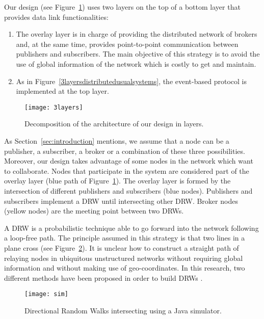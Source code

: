 \documentclass[conference]{IEEEtran}
\begin{document}
Our design (see Figure~\ref{3layers}) uses two layers on the top of a bottom layer that provides data link functionalities:

\begin{enumerate}
\item The overlay layer is in charge of providing the distributed network of brokers and, at the same time, provides point-to-point communication between publishers and subscribers. The main objective of this strategy is to avoid the use of global information of the network which is costly to get and maintain.
\item As in Figure~\ref{3layersdistributedusualsystems}, the event-based protocol is implemented at the top layer.
\end{enumerate}

\begin{figure}[!h]
\centering
\texttt{[image: 3layers]}
\caption{Decomposition of the architecture of our design in layers.}
\vspace{-1.00em}
\label{3layers}
\end{figure}

As Section~\ref{sec:introduction} mentions, we assume that a node can be a publisher, a subscriber, a broker or a combination of these three possibilities. Moreover, our design takes advantage of some nodes in the network which want to collaborate. Nodes that participate in the system are considered part of the overlay layer (blue path of Figure~\ref{3layers}). The overlay layer is formed by the intersection of different publishers and subscribers (blue nodes). Publishers and subscribers implement a DRW until intersecting other DRW. Broker nodes (yellow nodes) are the meeting point between two DRWs.

A DRW is a probabilistic technique able to go forward into the network following a loop-free path. The principle assumed in this strategy is that two lines in a plane cross (see Figure~\ref{sim}). It is unclear how to construct a straight path of relaying nodes in ubiquitous unstructured networks without requiring global information and without making use of geo-coordinates. In this research, two different methods have been proposed in order to build DRWs \cite{ASCOMS13DRW}\cite{SENSORNETS14DRW}.




\begin{figure}[!h]
\centering
\texttt{[image: sim]}
\caption{Directional Random Walks intersecting using a Java simulator.}
\vspace{-1em}
\label{sim}
\end{figure}
\end{document}
